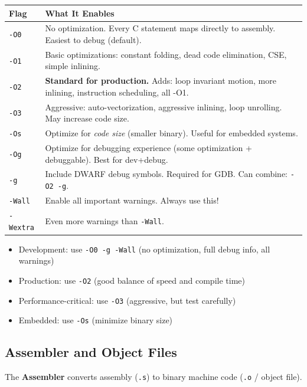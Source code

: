 \documentclass[11pt,a4paper]{article}
\newcommand{\code}[1]{\texttt{\small\colorbox{codebg}{\color{codekw}#1}}}
\newcommand{\term}[1]{\textbf{\color{darkblue}#1}}
\begin{document}
\begin{center}
\begin{tabular}{C{1.5cm} L{11cm}}
\toprule
\textbf{Flag} & \textbf{What It Enables} \\
\midrule
\code{-O0} & No optimization. Every C statement maps directly to assembly. Easiest to debug (default). \\
\code{-O1} & Basic optimizations: constant folding, dead code elimination, CSE, simple inlining. \\
\code{-O2} & \textbf{Standard for production.} Adds: loop invariant motion, more inlining, instruction scheduling, all -O1. \\
\code{-O3} & Aggressive: auto-vectorization, aggressive inlining, loop unrolling. May increase code size. \\
\code{-Os} & Optimize for \textit{code size} (smaller binary). Useful for embedded systems. \\
\code{-Og} & Optimize for debugging experience (some optimization + debuggable). Best for dev+debug. \\
\code{-g}  & Include DWARF debug symbols. Required for GDB. Can combine: \code{-O2 -g}. \\
\code{-Wall} & Enable all important warnings. Always use this! \\
\code{-Wextra} & Even more warnings than \code{-Wall}. \\
\bottomrule
\end{tabular}
\end{center}

\begin{keypoint}
\begin{itemize}[noitemsep]
  \item Development: use \code{-O0 -g -Wall} (no optimization, full debug info, all warnings)
  \item Production: use \code{-O2} (good balance of speed and compile time)
  \item Performance-critical: use \code{-O3} (aggressive, but test carefully)
  \item Embedded: use \code{-Os} (minimize binary size)
\end{itemize}
\end{keypoint}

\subsection{Assembler and Object Files}

The \term{Assembler} converts assembly (\texttt{.s}) to binary machine code (\texttt{.o} / object file).
\end{document}
